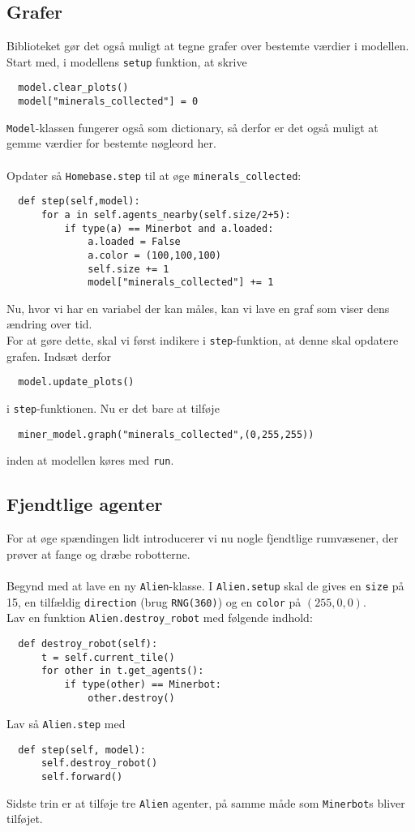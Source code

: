 \documentclass[12pt]{article}
\begin{document}
\subsection{Grafer}
Biblioteket gør det også muligt at tegne grafer over bestemte værdier i modellen. Start med, i modellens \texttt{setup} funktion, at skrive
\begin{lstlisting}
  model.clear_plots()
  model["minerals_collected"] = 0
\end{lstlisting}
\texttt{Model}-klassen fungerer også som dictionary, så derfor er det også muligt at gemme værdier for bestemte nøgleord her.\\\\
Opdater så \texttt{Homebase.step} til at øge \texttt{minerals\_collected}:
\begin{lstlisting}
  def step(self,model):
      for a in self.agents_nearby(self.size/2+5):
          if type(a) == Minerbot and a.loaded:
              a.loaded = False
              a.color = (100,100,100)
              self.size += 1
              model["minerals_collected"] += 1
\end{lstlisting}
Nu, hvor vi har en variabel der kan måles, kan vi lave en graf som viser dens ændring over tid.\\
For at gøre dette, skal vi først indikere i \texttt{step}-funktion, at denne skal opdatere grafen. Indsæt derfor
\begin{lstlisting}
  model.update_plots()
\end{lstlisting}
i \texttt{step}-funktionen. Nu er det bare at tilføje
\begin{lstlisting}
  miner_model.graph("minerals_collected",(0,255,255))
\end{lstlisting}
inden at modellen køres med \texttt{run}.

\subsection{Fjendtlige agenter}
For at øge spændingen lidt introducerer vi nu nogle fjendtlige rumvæsener, der prøver at fange og dræbe robotterne.\\\\
Begynd med at lave en ny \texttt{Alien}-klasse. I \texttt{Alien.setup} skal de gives en \texttt{size} på 15, en tilfældig \texttt{direction} (brug \texttt{RNG(360)}) og en \texttt{color} på $(255,0,0)$.\\
Lav en funktion \texttt{Alien.destroy\_robot} med følgende indhold:
\begin{lstlisting}
  def destroy_robot(self):
      t = self.current_tile()
      for other in t.get_agents():
          if type(other) == Minerbot:
              other.destroy()
\end{lstlisting}
Lav så \texttt{Alien.step} med
\begin{lstlisting}
  def step(self, model):
      self.destroy_robot()
      self.forward()
\end{lstlisting}
Sidste trin er at tilføje tre \texttt{Alien} agenter, på samme måde som \texttt{Minerbot}s bliver tilføjet.
\end{document}

